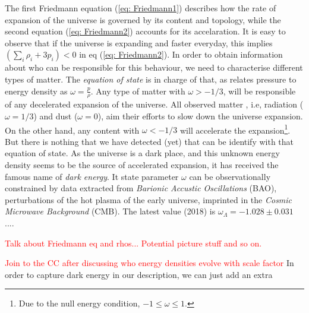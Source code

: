 \documentclass[11pt, a4paper]{article} %
\begin{document}
The first Friedmann equation (\ref{eq: Friedmann1}) describes how the rate of expansion of the universe is governed by its content and topology, while the second equation (\ref{eq: Friedmann2}) accounts for its accelaration. It is easy to observe that if the universe is expanding and faster everyday, this implies $\left(\sum_{i} \rho_{i} + 3 p_{i}\right) < 0$ in eq (\ref{eq: Friedmann2}). In order to obtain information about who can be responsible for this behaviour, we need to characterise different types of matter. The \textit{equation of state} is in charge of that, as relates pressure to energy density as $\omega = \tfrac{p}{\rho}$. Any type of matter with $\omega > - 1/3$, will be responsible of any decelerated expansion of the universe. All observed matter , i.e, radiation ($\omega = 1/3$) and dust ($\omega = 0$), aim their efforts to slow down the universe expansion. On the other hand, any content with $\omega < - 1/3$ will accelerate the expansion\footnote{Due to the null energy condition\cite{}, $-1\leq\omega\leq 1$. }. But there is nothing that we have detected (yet) that can be identify with that equation of state. As the universe is a dark place, and this unknown energy density seems to be the source of accelerated expansion, it has received the famous name of \textit{dark energy}. It state parameter $\omega$ can be observationally constrained by data extracted from \textit{Barionic Accustic Oscillations} (BAO), perturbations of the hot plasma of the early universe, imprinted in the \textit{Cosmic Microwave Background} (CMB). The latest value (2018) is $\omega_{\Lambda} = -1.028 \pm 0.031$ \cite{2020planck}....

\textcolor{red}{Talk about Friedmann eq and rhos... Potential picture stuff and so on.}



\textcolor{red}{Join to the CC after discussing who energy densities evolve with scale factor}
In order to capture dark energy in our description, we can just add an extra 







\cite{Danielsson:2018ztv}







\end{document}
